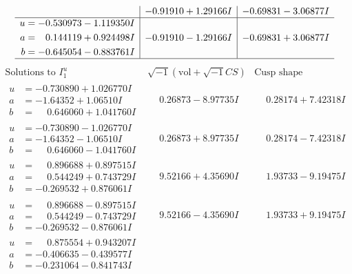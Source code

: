 \documentclass[1p]{elsarticle_modified}
\theoremstyle{definition}
\newcommand{\I}{\sqrt{-1}}
\begin{document}
$$\begin{array}{c|c|c}
 & -0.91910 + 1.29166 I & -0.69831 - 3.06877 I \\ \hline\begin{aligned}
u &= -0.530973 - 1.119350 I \\
a &= \phantom{-}0.144119 + 0.924498 I \\
b &= -0.645054 - 0.883761 I\end{aligned}
 & -0.91910 - 1.29166 I & -0.69831 + 3.06877 I\\
 \hline 
 \end{array}$$\newpage$$\begin{array}{c|c|c}  
\text{Solutions to }I^u_{1}& \I (\text{vol} + \sqrt{-1}CS) & \text{Cusp shape}\\
 \hline 
\begin{aligned}
u &= -0.730890 + 1.026770 I \\
a &= -1.64352 + 1.06510 I \\
b &= \phantom{-}0.646060 + 1.041760 I\end{aligned}
 & \phantom{-}0.26873 - 8.97735 I & \phantom{-}0.28174 + 7.42318 I \\ \hline\begin{aligned}
u &= -0.730890 - 1.026770 I \\
a &= -1.64352 - 1.06510 I \\
b &= \phantom{-}0.646060 - 1.041760 I\end{aligned}
 & \phantom{-}0.26873 + 8.97735 I & \phantom{-}0.28174 - 7.42318 I \\ \hline\begin{aligned}
u &= \phantom{-}0.896688 + 0.897515 I \\
a &= \phantom{-}0.544249 + 0.743729 I \\
b &= -0.269532 + 0.876061 I\end{aligned}
 & \phantom{-}9.52166 + 4.35690 I & \phantom{-}1.93733 - 9.19475 I \\ \hline\begin{aligned}
u &= \phantom{-}0.896688 - 0.897515 I \\
a &= \phantom{-}0.544249 - 0.743729 I \\
b &= -0.269532 - 0.876061 I\end{aligned}
 & \phantom{-}9.52166 - 4.35690 I & \phantom{-}1.93733 + 9.19475 I \\ \hline\begin{aligned}
u &= \phantom{-}0.875554 + 0.943207 I \\
a &= -0.406635 - 0.439577 I \\
b &= -0.231064 - 0.841743 I\end{aligned}

\end{array}$$
\end{document}
